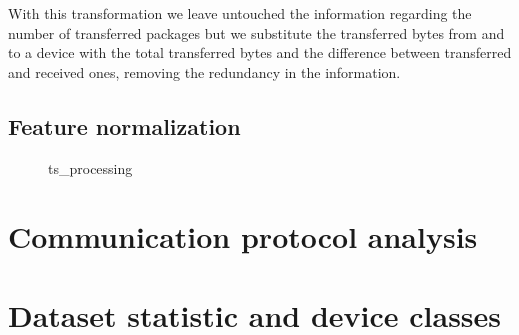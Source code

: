With this transformation we leave untouched the information regarding the number of transferred packages but we substitute the transferred bytes from and to a device with the total transferred bytes and the difference between transferred and received ones, removing the redundancy in the information.

\subsection{Feature normalization}




\begin{figure}
    \centering

%
\caption{ts\_processing}
    \label{fig:ts_processing}
\end{figure}

\section{Communication protocol analysis}
\lipsum[1]

\section{Dataset statistic and device classes}
\lipsum[1]


